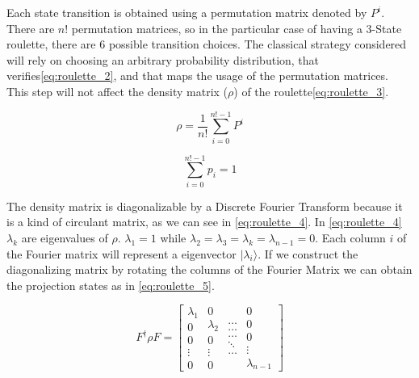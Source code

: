 Each state transition is obtained using a permutation matrix denoted by $P^{i}$. There are $n!$ permutation matrices, so in the particular case of having a $3$-State roulette, there are $6$ possible transition choices. The classical strategy considered will rely on choosing an arbitrary probability distribution, that verifies\eqref{eq:roulette_2}, and that maps the usage of the permutation matrices. This step will not affect the density matrix ($\rho$) of the roulette\eqref{eq:roulette_3}.

\begin{equation}
\label{eq:roulette_3}
\rho=\frac{1}{n!}\sum_{i=0}^{n!-1}P^{i}
\end{equation}

\begin{equation}
\label{eq:roulette_2}
\sum_{i=0}^{n!-1}p_{i}=1
\end{equation}

The density matrix is diagonalizable by a Discrete Fourier Transform because it is a kind of circulant matrix\cite{Davis1994}, as we can see in \eqref{eq:roulette_4}. In \eqref{eq:roulette_4} $\lambda_{k}$ are eigenvalues of $\rho$. $\lambda_{1}=1$
while $\lambda_{2}=\lambda_{3}=\lambda_{k}=\lambda_{n-1}=0$. Each column
$i$ of the Fourier matrix will represent a eigenvector $\vert\lambda_{i}\rangle$.
If we construct the diagonalizing matrix by rotating the columns of
the Fourier Matrix we can obtain the projection states as in \eqref{eq:roulette_5}.

\begin{equation}
\label{eq:roulette_4}
F^{\dagger}\rho F=\left[\begin{array}{c}
\lambda_{1}\\
0\\
0\\
\vdots\\
0
\end{array}\begin{array}{c}
0\\
\lambda_{2}\\
0\\
\vdots\\
0
\end{array}\begin{array}{c}
\ldots\\
\ldots\\
\ldots\\
\ddots\\
\ldots
\end{array}\begin{array}{c}
0\\
0\\
0\\
\vdots\\
\lambda_{n-1}
\end{array}\right]
\end{equation}



